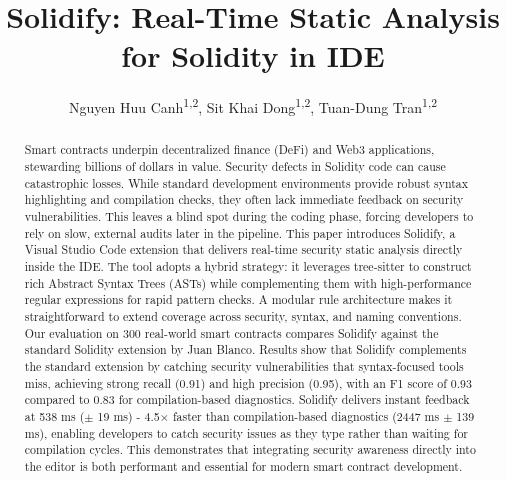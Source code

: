 \documentclass[10pt, a4paper]{article}
\begin{document}
\title{\textbf{Solidify: Real-Time Static Analysis for Solidity in IDE}}
\author{
    Nguyen Huu Canh\textsuperscript{1,2}, 
    Sit Khai Dong\textsuperscript{1,2}, 
    Tuan-Dung Tran\textsuperscript{1,2}
}
\date{}
\maketitle

\begin{abstract}
Smart contracts underpin decentralized finance (DeFi) and Web3 applications, stewarding billions of dollars in value. Security defects in Solidity code can cause catastrophic losses. While standard development environments provide robust syntax highlighting and compilation checks, they often lack immediate feedback on security vulnerabilities. This leaves a blind spot during the coding phase, forcing developers to rely on slow, external audits later in the pipeline. This paper introduces Solidify, a Visual Studio Code extension that delivers real-time security static analysis directly inside the IDE. The tool adopts a hybrid strategy: it leverages tree-sitter to construct rich Abstract Syntax Trees (ASTs) while complementing them with high-performance regular expressions for rapid pattern checks. A modular rule architecture makes it straightforward to extend coverage across security, syntax, and naming conventions. Our evaluation on 300 real-world smart contracts compares Solidify against the standard Solidity extension by Juan Blanco. Results show that Solidify complements the standard extension by catching security vulnerabilities that syntax-focused tools miss, achieving strong recall (0.91) and high precision (0.95), with an F1 score of 0.93 compared to 0.83 for compilation-based diagnostics. Solidify delivers instant feedback at 538 ms ($\pm$ 19 ms) - 4.5$\times$ faster than compilation-based diagnostics (2447 ms $\pm$ 139 ms), enabling developers to catch security issues as they type rather than waiting for compilation cycles. This demonstrates that integrating security awareness directly into the editor is both performant and essential for modern smart contract development.
\end{abstract}
\end{document}
